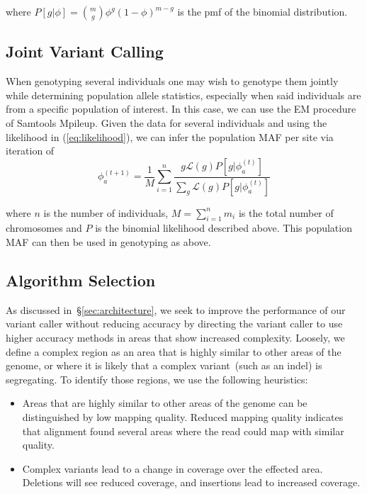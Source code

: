 \documentclass{acm_proc_article-sp}
\begin{document}
where $P[g|\phi] = {m\choose g} \phi^g (1-\phi)^{m-g}$ is the pmf of the binomial distribution.

\subsection{Joint Variant Calling}
\label{sec:joint-variant-calling}
When genotyping several individuals one may wish to genotype them jointly while determining population allele statistics,
 especially when said individuals are from a specific population of interest. In this case, we can use the EM procedure of
 Samtools Mpileup. Given the data for several individuals and using the likelihood in (\ref{eq:likelihood}), we can
 infer the population MAF per site via iteration of
 \begin{equation}
 \phi_a^{(t+1)} = \frac{1}{M}\sum_{i=1}^n\frac{g\mathcal{L}(g)P[g | \phi_a^{(t)}] }{ \sum_g \mathcal{L}(g)P[g | \phi_a^{(t)}]}
 \end{equation}
 
 where $n$ is the number of individuals, $M=\sum_{i=1}^nm_i$ is the total number of chromosomes and $P$ is the binomial
 likelihood described above. This population MAF can then be used in genotyping as above. 


\subsection{Algorithm Selection}
\label{sec:algorithm-selection}


As discussed in~\S\ref{sec:architecture}, we seek to improve the performance of our variant caller without reducing accuracy by directing
the variant caller to use higher accuracy methods in areas that show increased complexity. Loosely, we define a complex region as an
area that is highly similar to other areas of the genome, or where it is likely that a complex variant~(such as an indel) is segregating. To
identify those regions, we use the following heuristics:

\begin{itemize}
\item Areas that are highly similar to other areas of the genome can be distinguished by low mapping quality. Reduced mapping quality
indicates that alignment found several areas where the read could map with similar quality.
\item Complex variants lead to a change in coverage over the effected area. Deletions will see reduced coverage, and insertions lead
to increased coverage.
\end{itemize}
\end{document}
